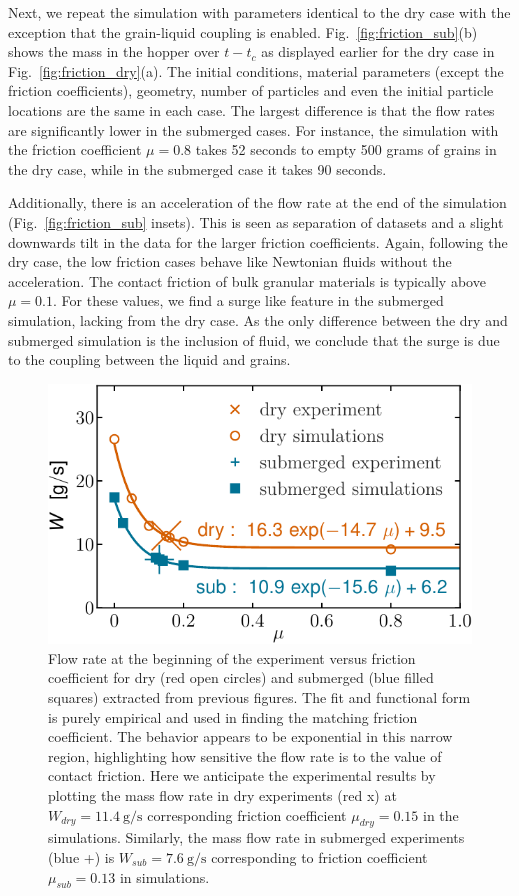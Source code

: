 \documentclass[twoside,twocolumn,9pt]{article}
\begin{document}
Next, we repeat the simulation with parameters identical to the dry case with the exception that the grain-liquid coupling is enabled. Fig.~\ref{fig:friction_sub}(b) shows the mass in the hopper over $t-t_{c}$ as displayed earlier for the dry case in Fig.~\ref{fig:friction_dry}(a). The initial conditions, material parameters (except the friction coefficients), geometry, number of particles and even the initial particle locations are the same in each case. The largest difference is that the flow rates are significantly lower in the submerged cases. For instance, the simulation with the friction coefficient $\mu=0.8$ takes 52 seconds to empty 500 grams of grains in the dry case, while in the submerged case it takes 90 seconds. 

Additionally, there is an acceleration of the flow rate at the end of the simulation (Fig.~\ref{fig:friction_sub} insets). This is seen as separation of datasets and a slight downwards tilt in the data for the larger friction coefficients. Again, following the dry case, the low friction cases behave like Newtonian fluids without the acceleration. The contact friction of bulk granular materials is typically above $\mu=0.1$. For these values, we find a surge like feature in the submerged simulation, lacking from the dry case. As the only difference between the dry and submerged simulation is the inclusion of fluid, we conclude that the surge is due to the coupling between the liquid and grains.
%
\begin{figure}[!t]
\includegraphics[width=\columnwidth]{fig7-wwo_vs_mu.pdf}
\caption{Flow rate at the beginning of the experiment versus friction coefficient for dry (red open circles) and submerged (blue filled squares) extracted from previous figures. The fit and functional form is purely empirical and used in finding the matching friction coefficient. The behavior appears to be exponential in this narrow region, highlighting how sensitive the flow rate is to the value of contact friction. Here we anticipate the experimental results by plotting the mass flow rate in dry experiments (red x) at $W_{dry} = 11.4~\mathrm{g/s}$ corresponding friction coefficient $\mu_{dry}=0.15$ in the simulations. Similarly, the mass flow rate in submerged experiments (blue +) is $W_{sub}=7.6~\mathrm{g/s}$ corresponding to friction coefficient $\mu_{sub} = 0.13$ in simulations.}\label{fig:q_vs_mu}
\end{figure}
\end{document}
